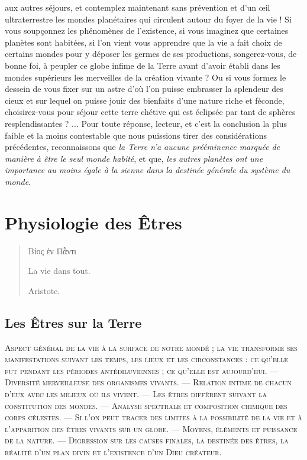\documentclass[a4paper, 11pt, oneside]{article}
\begin{document}
aux autres séjours, et contemplez maintenant sans prévention et d'un œil ultraterrestre les mondes planétaires qui circulent autour du foyer de la vie ! Si vous soupçonnez les phénomènes de l'existence, si vous imaginez que certaines planètes sont habitées, si l'on vient vous apprendre que la vie a fait choix de certains mondes pour y déposer les germes de ses productions, songerez-vous, de bonne foi, à peupler ce globe infime de la Terre avant d'avoir établi dans les mondes supérieurs les merveilles de la création vivante ? Ou si vous formez le dessein de vous fixer sur un astre d'où l'on puisse embrasser la splendeur des cieux et sur lequel on puisse jouir des bienfaits d'une nature riche et féconde, choisirez-vous pour séjour cette terre chétive qui est éclipsée par tant de sphères resplendissantes ? ... Pour toute réponse, lecteur, et c'est la conclusion la plus faible et la moins contestable que nous puissions tirer des considérations précédentes, reconnaissons que \emph{la Terre n'a aucune prééminence marquée de manière à être le seul monde habité}, et que, \emph{les autres planètes ont une importance au moins égale à la sienne dans la destinée générale du système du monde}.
\clearpage
\section{Physiologie des Êtres}
\begin{quotation}
Βίος ἑν Πἆντι

La vie dans tout.

\hspace*{5mm}Aristote.
\end{quotation}

\bigskip

\subsection{Les Êtres sur la Terre}
\begin{center}
\scshape
\small
Aspect général de la vie à la surface de notre mondé ; la vie transforme ses manifestations suivant les temps, les lieux et les circonstances : ce qu'elle fut pendant les périodes antédiluviennes ; ce qu'elle est aujourd'hui. --- Diversité merveilleuse des organismes vivants. --- Relation intime de chacun d'eux avec les milieux où ils vivent. --- Les êtres diffèrent suivant la constitution des mondes. --- Analyse spectrale et composition chimique des corps célestes. --- Si l'on peut tracer des limites à la possibilité de la vie et à l'apparition des êtres vivants sur un globe. --- Moyens, éléments et puissance de la nature. --- Digression sur les causes finales, la destinée des êtres, la réalité d'un plan divin et l'existence d'un Dieu créateur.
\end{center}
\end{document}
